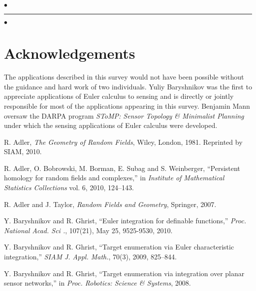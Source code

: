 \documentclass{psapm-l}
\theoremstyle{definition}
\theoremstyle{remark}
\numberwithin{equation}{section}
\begin{document}
\vspace{0.1in}

{
\begin{center}
\nointerlineskip\vspace{-0.04in}
        $\bullet$\hfill\rule{0.77\linewidth}{1.0pt}\hfill$\bullet$
\par\nointerlineskip\vspace{-0.01in}
\end{center}
}

\vspace{0.1in}

{\small
\section*{Acknowledgements}

The applications described in this survey would not have been possible without the guidance and hard work of two individuals.  Yuliy Baryshnikov was the first to appreciate applications of Euler calculus to sensing and is directly or jointly responsible for most of the  applications appearing in this survey. Benjamin Mann oversaw the DARPA program {\em SToMP: Sensor Topology \& Minimalist Planning} under which the sensing applications of Euler calculus were developed.


\begin{thebibliography}{A}

 R. Adler, {\em The Geometry of Random Fields}, Wiley, London, 1981. Reprinted by SIAM, 2010.

 R. Adler, O. Bobrowski, M. Borman, E. Subag and S. Weinberger, ``Persistent homology for random fields and complexes,'' in {\em Institute of Mathematical Statistics Collections} vol. 6, 2010, 124--143.

 R. Adler and J. Taylor, {\em Random Fields and Geometry}, Springer, 2007.

 Y. Baryshnikov and R. Ghrist, ``Euler integration for definable functions,'' {\em Proc. National Acad. Sci .}, 107(21), May 25, 9525-9530, 2010.

 Y. Baryshnikov and R. Ghrist, ``Target enumeration via Euler characteristic integration,'' {\em SIAM J. Appl. Math.},  70(3), 2009, 825--844.

 Y. Baryshnikov and R. Ghrist, ``Target enumeration via integration over planar sensor networks,'' in {\em Proc. Robotics: Science \& Systems}, 2008.


\end{thebibliography}}
\end{document}
